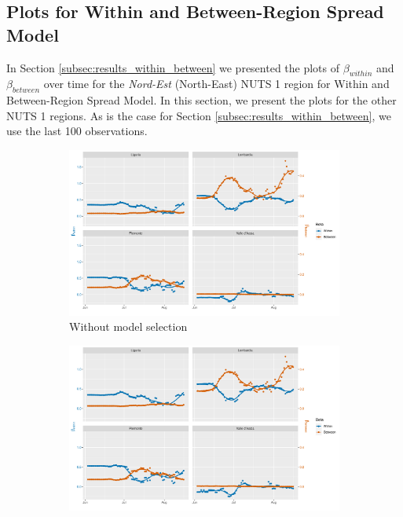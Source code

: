 \documentclass[12pt]{article}
\begin{document}
\begin{appendices}
		\subsection{Plots for Within and Between-Region Spread Model} \label{sapp:model3_plots}
		In Section \ref{subsec:results_within_between} we presented the plots of $\beta_{within}$ and $\beta_{between}$ over time for the \textit{Nord-Est} (North-East) NUTS 1 region for Within and Between-Region Spread Model. In this section, we present the plots for the other NUTS 1 regions. As is the case for Section \ref{subsec:results_within_between}, we use the last 100 observations.
		
		\begin{figure}[H]
    	    \centering
    	    \begin{subfigure}{\textwidth}
    	      \centering
    	      \includegraphics[width=0.95\linewidth]{output/model3_lag3_betas_Nord-Ovest_rolling.pdf}
    	      \caption{Without model selection}
    	      \label{fig:beta_within_between_over_time_nordovest_regular}
    	    \end{subfigure}\newline
    	    \begin{subfigure}{\textwidth}
    	      \centering
    	      \includegraphics[width=0.95\linewidth]{output/model3_lag3_betas_Nord-Ovest_aic_rolling.pdf}

\end{subfigure}
\end{figure}
\end{appendices}
\end{document}
